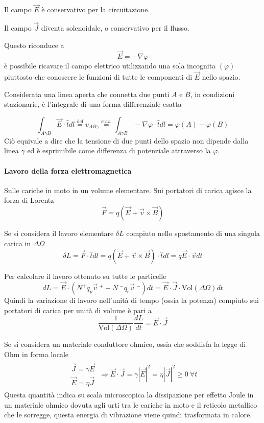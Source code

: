 Il campo $\vec{E}$ è conservativo per la circuitazione.

Il campo $\vec{J}$ diventa solenoidale, o conservativo per il flusso.

Questo riconduce a
$$
\vec{E} = -\nabla\varphi
$$
è possibile ricavare il campo elettrico utilizzando una sola incognita $(\varphi)$ piuttosto che
conoscere le funzioni di tutte le componenti di $\vec{E}$ nello spazio.

Considerata una linea aperta che connetta due punti $A$ e $B$, in condizioni stazionarie, è l'integrale di una forma differenziale esatta

$$
\int_{A\gamma B}\vec{E}\cdot\hat{t}dl \stackrel{\text{def}}{=} v_{AB\gamma} \stackrel{\text{staz.}}{=}
\int_{A\gamma B}-\nabla\varphi\cdot\hat{t}dl =\varphi(A)-\varphi(B)
$$
Ciò equivale a dire che la tensione di due punti dello spazio non dipende dalla linea $\gamma$ ed è
esprimibile come differenza di potenziale attraverso la $\varphi$.

\paragraph{Lavoro della forza elettromagnetica} Sulle cariche in moto in un volume elementare.
Sui portatori di carica agisce la forza di Lorentz
$$
\vec{F} = q\left(\vec{E}+\vec{v}\times\vec{B}\right)
$$

Se si considera il lavoro elementare $\delta L$ compiuto nello spostamento di una singola carica in
$\Delta\Omega$
$$
\delta L = \vec{F}\cdot\hat{t}dl = q\left(\vec{E}+\vec{v}\times\vec{B}\right)\cdot \hat{t} dl = q\vec{E}\cdot\vec{v}dt
$$

Per calcolare il lavoro ottenuto su tutte le particelle
$$
dL = \vec{E}\cdot\left(N^+q_p\vec{v}\ ^+ + N\ ^-q_e\vec{v}\ ^-\right)dt = \vec{E}\cdot\vec{J}\cdot \text{Vol}(\Delta\Omega)dt
$$
Quindi la variazione di lavoro nell'unità di tempo (ossia la potenza) compiuto sui portatori di carica
per unità di volume è pari a
$$
\frac{1}{\text{Vol}(\Delta\Omega)}\frac{dL}{dt} = \vec{E}\cdot\vec{J} 
$$

Se si considera un materiale conduttore ohmico, ossia che soddisfa la legge di Ohm in forma locale
\begin{align*}
\begin{matrix}
\vec{J} = \gamma\vec{E} \\
\vec{E} = \eta\vec{J}
\end{matrix}\ 
\Rightarrow \vec{E}\cdot\vec{J} = \gamma\left|\vec{E}\right|^2
= \eta\left|\vec{J}\right|^2 \geq 0 \ \forall t
\end{align*}
Questa quantità indica su scala microscopica la dissipazione per effetto Joule in un materiale ohmico
dovuta agli urti tra le cariche in moto e il reticolo metallico che le sorregge, questa energia di
vibrazione viene quindi trasformata in calore.
